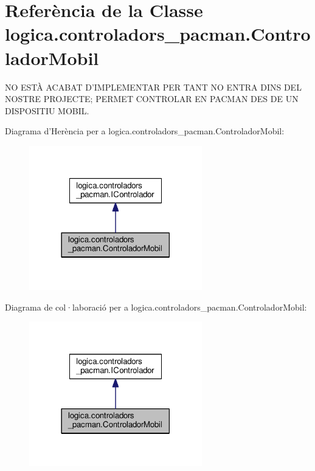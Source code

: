 \hypertarget{classlogica_1_1controladors__pacman_1_1_controlador_mobil}{\section{Referència de la Classe logica.\+controladors\+\_\+pacman.\+Controlador\+Mobil}
\label{classlogica_1_1controladors__pacman_1_1_controlador_mobil}
}


N\+O E\+S\+TÀ A\+C\+A\+B\+A\+T D'I\+M\+P\+L\+E\+M\+E\+N\+T\+A\+R P\+E\+R T\+A\+N\+T N\+O E\+N\+T\+R\+A D\+I\+N\+S D\+E\+L N\+O\+S\+T\+R\+E P\+R\+O\+J\+E\+C\+T\+E; P\+E\+R\+M\+E\+T C\+O\+N\+T\+R\+O\+L\+A\+R E\+N P\+A\+C\+M\+A\+N D\+E\+S D\+E U\+N D\+I\+S\+P\+O\+S\+I\+T\+I\+U M\+O\+B\+I\+L.  




Diagrama d'Herència per a logica.\+controladors\+\_\+pacman.\+Controlador\+Mobil\+:\nopagebreak
\begin{figure}[H]
\begin{center}
\leavevmode
\includegraphics[width=213pt]{classlogica_1_1controladors__pacman_1_1_controlador_mobil__inherit__graph}
\end{center}
\end{figure}


Diagrama de col·laboració per a logica.\+controladors\+\_\+pacman.\+Controlador\+Mobil\+:\nopagebreak
\begin{figure}[H]
\begin{center}
\leavevmode
\includegraphics[width=213pt]{classlogica_1_1controladors__pacman_1_1_controlador_mobil__coll__graph}
\end{center}
\end{figure}

